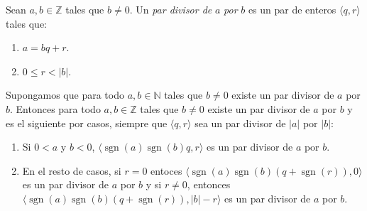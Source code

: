\begin{definition}
  \label{df:parDivisor}
  Sean $a,b\in \mathbb{Z}$ tales que $b\neq 0$. Un \textit{par divisor
    de} $a$ \textit{por} $b$  es un par de enteros
  $\langle q,r\rangle$ tales que:
  \begin{enumerate}
  \item $a=bq+r$.
  \item $0\leq r<|b|$.
  \end{enumerate}
\end{definition}

\begin{lemma}
  \label{lm:casoNegativos}
  Supongamos que para todo $a,b\in\mathbb{N}$ tales que $b\neq 0$
  existe un par divisor de $a$ por $b$. Entonces para todo
  $a,b\in\mathbb{Z}$ tales que $b\neq 0$ existe un par divisor de $a$
  por $b$ y es el siguiente por casos, siempre que
  $\langle q,r\rangle$ sea un par divisor de $|a|$ por $|b|$:
  \begin{enumerate}
  \item Si $0<a$ y $b<0$,
    $\langle\operatorname{sgn}(a)\operatorname{sgn}(b)q,r\rangle$ es
    un par divisor de $a$ por $b$.
  \item En el resto de casos, si $r=0$ entoces
    $\langle\operatorname{sgn}(a)\operatorname{sgn}(b)(q+\operatorname{sgn}(r)),0\rangle$
    es un par divisor de $a$ por $b$ y si $r\neq 0$, entonces $\langle\operatorname{sgn}(a)\operatorname{sgn}(b)(q+\operatorname{sgn}(r)),|b|-r\rangle$
    es un par divisor de $a$ por $b$.
  \end{enumerate}
\end{lemma}

